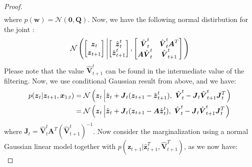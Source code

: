 \begin{proof}
\begin{equation*}
\begin{aligned}
    \end{aligned}
    \end{equation*}
    where $p(\boldsymbol w) = \mathcal{N}(\boldsymbol 0, \boldsymbol Q)$. Now, we have the following normal distirbution for the joint :
    \begin{equation*}
        \mathcal{N}\left( 
        \begin{bmatrix}
            \boldsymbol z_t \\ \boldsymbol z_{t+1}
        \end{bmatrix} \left|
        \begin{bmatrix}
            \hat{\boldsymbol z}_t^t \\ \hat{\boldsymbol z}_{t+1}^t
        \end{bmatrix}, 
        \begin{bmatrix}
            \hat{\boldsymbol V}^t_t & \hat{\boldsymbol V}^t_t \boldsymbol A^T \\
            \boldsymbol A\hat{\boldsymbol V}^t_t & \hat{\boldsymbol V}^t_{t+1}
        \end{bmatrix}\right. \right)
    \end{equation*}
    Please note that the value $\hat{\boldsymbol V}^t_{t+1}$ can be found in the intermediate value of the filtering. Now, we use conditional Gaussian result from above, and we have:
    \begin{equation*}
    \begin{aligned}
        p(\boldsymbol z_t | \boldsymbol z_{t+1}, \boldsymbol x_{1:t}) 
        &= \mathcal{N}\left( \boldsymbol z_t \left| \hat{\boldsymbol z}_t +  \boldsymbol J_t(\boldsymbol z_{t+1} - \hat{\boldsymbol z}^t_{t+1}) , \  \hat{\boldsymbol V}^t_t - \boldsymbol J_t\hat{\boldsymbol V}^t_{t+1} \boldsymbol J_t^T \right. \right) \\ 
        &= \mathcal{N}\left( \boldsymbol z_t \left| \hat{\boldsymbol z}_t +  \boldsymbol J_t(\boldsymbol z_{t+1} - \boldsymbol A\hat{\boldsymbol z}^t_{t}) , \  \hat{\boldsymbol V}^t_t - \boldsymbol J_t\hat{\boldsymbol V}^t_{t+1} \boldsymbol J_t^T \right. \right) \\ 
    \end{aligned}
    \end{equation*} 
    where $\boldsymbol J_t = \hat{\boldsymbol V}^t_t \boldsymbol A^T(\hat{\boldsymbol V}^t_{t+1})^{-1}$. Now consider the marginalization using a normal Gaussian linear model together with $p(\boldsymbol z_{t+1} | \hat{\boldsymbol z}^T_{t+1}, \hat{\boldsymbol V}^T_{t+1})$, as we now have:
    \begin{equation*}

\end{equation*}
\end{proof}
